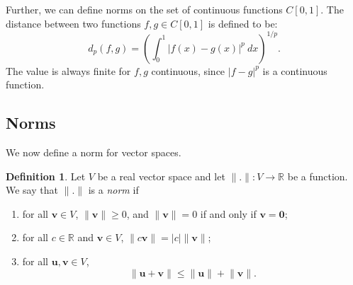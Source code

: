 \documentclass[a4paper, openany]{memoir}
\theoremstyle{definition}
\newtheorem{definition}{Definition}[section]
\theoremstyle{plain}
\begin{document}
Further, we can define norms on the set of continuous functions $C[0, 1]$. The distance between two functions $f, g \in C[0, 1]$ is defined to be:
\[d_p(f, g) = \left(\int_0^1 |f(x) - g(x)|^p \ dx\right)^{1/p}.\]
The value is always finite for $f, g$ continuous, since $|f - g|^p$ is a continuous function.

\subsection{Norms}
We now define a norm for vector spaces.
\begin{definition}
    Let $V$ be a real vector space and let $\lVert . \rVert: V \to \mathbb{R}$ be a function. We say that $\lVert . \rVert$ is a \emph{norm} if
    \begin{enumerate}[label=\textbf{N\arabic*.}]
        \item for all $\bm{v} \in V$, $\lVert \bm{v} \rVert \geq 0$, and $\lVert \bm{v} \rVert = 0$ if and only if $\bm{v} = \bm{0}$;
        \item for all $c \in \mathbb{R}$ and $\bm{v} \in V$, $\lVert c \bm{v} \rVert = |c| \lVert \bm{v} \rVert$;
        \item for all $\bm{u}, \bm{v} \in V$, 
        \[\lVert \bm{u} + \bm{v} \rVert \leq \lVert \bm{u} \rVert + \lVert \bm{v} \rVert.\]
    \end{enumerate}
\end{definition}
\end{document}
